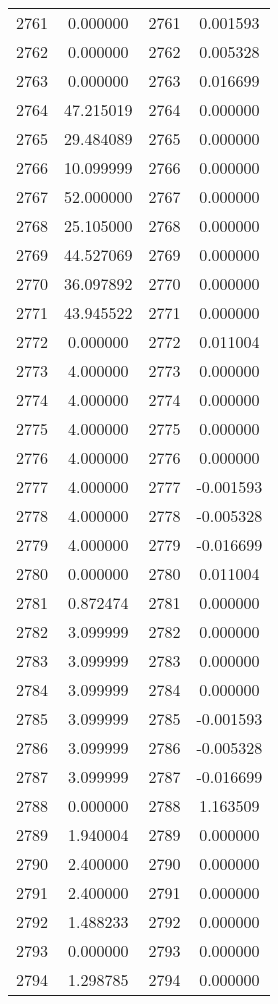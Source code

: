 \documentclass[12pt]{article}
\begin{document}
\begin{longtable}{@{}cccc@{}}
2761 & 0.000000 & 2761 & 0.001593 \\
2762 & 0.000000 & 2762 & 0.005328 \\
2763 & 0.000000 & 2763 & 0.016699 \\
2764 & 47.215019 & 2764 & 0.000000 \\
2765 & 29.484089 & 2765 & 0.000000 \\
2766 & 10.099999 & 2766 & 0.000000 \\
2767 & 52.000000 & 2767 & 0.000000 \\
2768 & 25.105000 & 2768 & 0.000000 \\
2769 & 44.527069 & 2769 & 0.000000 \\
2770 & 36.097892 & 2770 & 0.000000 \\
2771 & 43.945522 & 2771 & 0.000000 \\
2772 & 0.000000 & 2772 & 0.011004 \\
2773 & 4.000000 & 2773 & 0.000000 \\
2774 & 4.000000 & 2774 & 0.000000 \\
2775 & 4.000000 & 2775 & 0.000000 \\
2776 & 4.000000 & 2776 & 0.000000 \\
2777 & 4.000000 & 2777 & -0.001593 \\
2778 & 4.000000 & 2778 & -0.005328 \\
2779 & 4.000000 & 2779 & -0.016699 \\
2780 & 0.000000 & 2780 & 0.011004 \\
2781 & 0.872474 & 2781 & 0.000000 \\
2782 & 3.099999 & 2782 & 0.000000 \\
2783 & 3.099999 & 2783 & 0.000000 \\
2784 & 3.099999 & 2784 & 0.000000 \\
2785 & 3.099999 & 2785 & -0.001593 \\
2786 & 3.099999 & 2786 & -0.005328 \\
2787 & 3.099999 & 2787 & -0.016699 \\
2788 & 0.000000 & 2788 & 1.163509 \\
2789 & 1.940004 & 2789 & 0.000000 \\
2790 & 2.400000 & 2790 & 0.000000 \\
2791 & 2.400000 & 2791 & 0.000000 \\
2792 & 1.488233 & 2792 & 0.000000 \\
2793 & 0.000000 & 2793 & 0.000000 \\
2794 & 1.298785 & 2794 & 0.000000 \\

\end{longtable}
\end{document}
